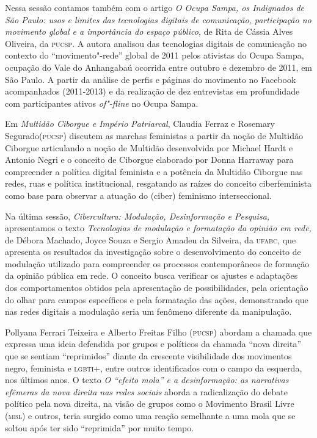 Nessa sessão contamos também com o artigo \emph{O Ocupa Sampa, os
Indignados de São Paulo: usos e limites das tecnologias digitais de
comunicação, participação no movimento global e a importância do espaço
público,} de Rita de Cássia Alves Oliveira, da \textsc{pucsp}. A autora analisou
das tecnologias digitais de comunicação no contexto do
``movimento"-rede'' global de 2011 pelos ativistas do Ocupa Sampa,
ocupação do Vale do Anhangabaú ocorrida entre outubro e dezembro de
2011, em São Paulo. A partir da análise de perfis e páginas do movimento
no Facebook acompanhados (2011-2013) e da realização de dez entrevistas
em profundidade com participantes ativos \emph{of"-fline} no Ocupa Sampa.

Em \emph{Multidão Ciborgue e Império Patriarcal}, Claudia Ferraz e
Rosemary Segurado(\textsc{pucsp}) discutem as marchas feministas a partir da
noção de Multidão Ciborgue articulando a noção de Multidão desenvolvida
por Michael Hardt e Antonio Negri e o conceito de Ciborgue elaborado por
Donna Harraway para compreender a política digital feminista e a
potência da Multidão Ciborgue nas redes, ruas e política institucional,
resgatando as raízes do conceito ciberfeminista como base para observar
a atuação do (ciber) feminismo interseccional.

Na última sessão, \emph{Cibercultura: Modulação, Desinformação e
Pesquisa,} apresentamos o texto \emph{Tecnologias de modulação e
formatação da opinião em rede,} de Débora Machado, Joyce Souza e Sergio
Amadeu da Silveira, da \textsc{ufabc}, que apresenta os resultados da
investigação sobre o desenvolvimento do conceito de modulação utilizado
para compreender os processos contemporâneos de formação da opinião
pública em rede. O conceito busca verificar os ajustes e adaptações dos
comportamentos obtidos pela apresentação de possibilidades, pela
orientação do olhar para campos específicos e pela formatação das ações,
demonstrando que nas redes digitais a modulação seria um fenômeno
diferente da manipulação.

Pollyana Ferrari Teixeira e Alberto Freitas Filho (\textsc{pucsp}) abordam a
chamada que expressa uma ideia defendida por grupos e políticos da
chamada ``nova direita'' que se sentiam ``reprimidos'' diante da
crescente visibilidade dos movimentos negro, feminista e \textsc{lgbti}+, entre
outros identificados com o campo da esquerda, nos últimos anos. O texto
\emph{O ``efeito mola'' e a desinformação: as narrativas efêmeras da
nova direita nas redes sociais} aborda a radicalização do debate
político pela nova direita, na visão de grupos como o Movimento Brasil
Livre (\textsc{mbl}) e outros, teria surgido como uma reação semelhante a uma
mola que se soltou após ter sido ``reprimida'' por muito tempo.

